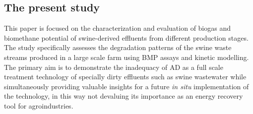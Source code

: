 \subsection{The present study}
This paper is focused on the characterization and evaluation of biogas and biomethane potential of swine-derived effluents from different production stages. The study specifically assesses the degradation patterns of the swine waste streams produced in a large scale farm using BMP assays and kinetic modelling. The primary aim is to demonstrate the inadequacy of AD as a full scale treatment technology of specially dirty effluents such as swine wastewater while simultaneously providing valuable insights for a future \textit{in situ} implementation of the technology, in this way not devaluing its importance as an energy recovery tool for agroindustries.